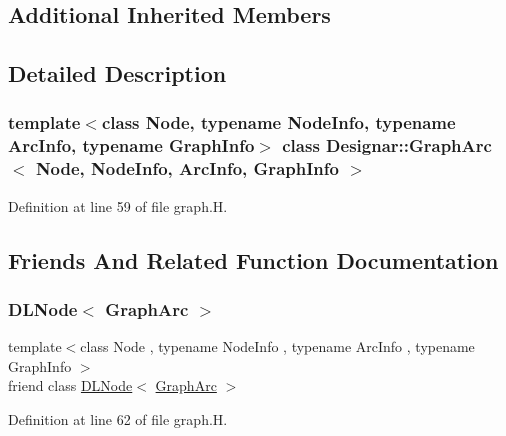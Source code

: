 \subsection*{Additional Inherited Members}


\subsection{Detailed Description}
\subsubsection*{template$<$class Node, typename Node\+Info, typename Arc\+Info, typename Graph\+Info$>$\newline
class Designar\+::\+Graph\+Arc$<$ Node, Node\+Info, Arc\+Info, Graph\+Info $>$}



Definition at line 59 of file graph.\+H.



\subsection{Friends And Related Function Documentation}
\mbox{\label{class_designar_1_1_graph_arc_a94936ca2e45f109cf3805a93858fbc75}} 
\subsubsection{\texorpdfstring{D\+L\+Node$<$ Graph\+Arc $>$}{DLNode< GraphArc >}}
{\footnotesize\ttfamily template$<$class Node , typename Node\+Info , typename Arc\+Info , typename Graph\+Info $>$ \\
friend class \hyperlink{class_designar_1_1_d_l_node}{D\+L\+Node}$<$ \hyperlink{class_designar_1_1_graph_arc}{Graph\+Arc} $>$\hspace{0.3cm}{\ttfamily [friend]}}



Definition at line 62 of file graph.\+H.

\mbox{\label{class_designar_1_1_graph_arc_a0a9834688687d864501bbb9c85b0d32c}} 
